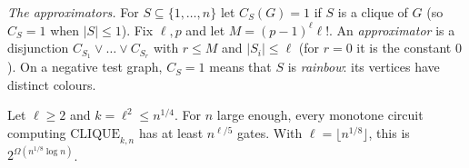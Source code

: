 \emph{The approximators.} For $S\subseteq\{1,\dots,n\}$ let $C_S(G)=1$ if $S$ is a clique of $G$ (so $C_S=1$ when $|S|\le1$). Fix $\ell,p$ and let $M=(p-1)^\ell\ell!$. An \emph{approximator} is a disjunction $C_{S_1}\lor\dots\lor C_{S_r}$ with $r\le M$ and $|S_i|\le\ell$ (for $r=0$ it is the constant $0$). On a negative test graph, $C_S=1$ means that $S$ is \emph{rainbow}: its vertices have distinct colours.

\begin{theorem}\label{thm:monotoneclique}
Let $\ell\ge2$ and $k=\ell^2\le n^{1/4}$. For $n$ large enough, every monotone circuit computing $\mathrm{CLIQUE}_{k,n}$ has at least $n^{\ell/5}$ gates. With $\ell=\lfloor n^{1/8}\rfloor$, this is $2^{\Omega(n^{1/8}\log n)}$.
\end{theorem}

